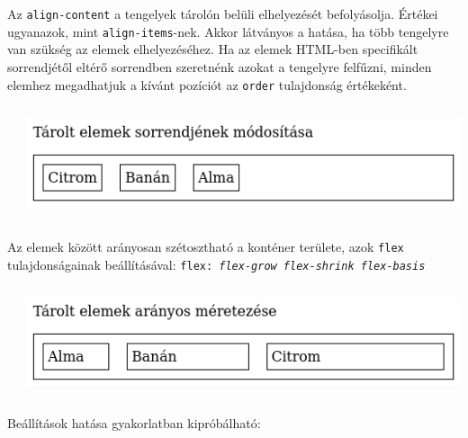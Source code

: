 %
\begin{frame}
  Az \texttt{align-content} a tengelyek tárolón belüli elhelyezését befolyásolja. Értékei ugyanazok, mint \texttt{align-items}-nek. Akkor látványos a hatása, ha több tengelyre van szükség az elemek elhelyezéséhez.
  \vfill
  Ha az elemek HTML-ben specifikált sorrendjétől eltérő sorrendben szeretnénk azokat a tengelyre felfűzni, minden elemhez megadhatjuk a kívánt pozíciót az \texttt{order} tulajdonság értékeként.
  \vfill
  \begin{columns}
      \begin{exampleblock}{}
        \scriptsize
        
      \end{exampleblock}
      \includegraphics[width=\textwidth]{order.png}
  \end{columns}
\end{frame}

%
\begin{frame}
  Az elemek között arányosan szétosztható a konténer területe, azok \texttt{flex} tulajdonságainak beállításával: \texttt{flex: \emph{flex-grow flex-shrink flex-basis}}
  \vfill
  \begin{columns}
      \begin{exampleblock}{}
        \scriptsize
        
      \end{exampleblock}
      \includegraphics[width=\textwidth]{flex.png}
  \end{columns}
  \vfill
  Beállítások hatása gyakorlatban kipróbálható: 
\end{frame}
